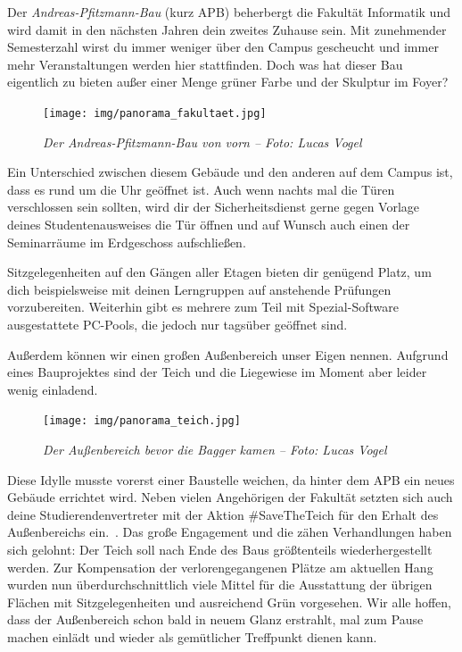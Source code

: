 
Der \emph{Andreas-Pfitzmann-Bau} (kurz APB) beherbergt die Fakultät Informatik und wird damit in den nächsten Jahren dein zweites Zuhause sein.
Mit zunehmender Semesterzahl wirst du immer weniger über den Campus gescheucht und immer mehr Veranstaltungen werden hier stattfinden.
Doch was hat dieser Bau eigentlich zu bieten außer einer Menge grüner Farbe und der Skulptur im Foyer?

\begin{figure}[h!]
    \centering
    \texttt{[image: img/panorama\_fakultaet.jpg]}
    \caption*{\small \textit{Der Andreas-Pfitzmann-Bau von vorn -- Foto: Lucas Vogel}}
\end{figure}

Ein Unterschied zwischen diesem Gebäude und den anderen auf dem Campus ist, dass es rund um die Uhr geöffnet ist. Auch wenn nachts mal die Türen verschlossen sein sollten, wird dir der Sicherheitsdienst gerne gegen Vorlage deines Studentenausweises die Tür öffnen und auf Wunsch auch einen der Seminarräume im Erdgeschoss aufschließen.

Sitzgelegenheiten auf den Gängen aller Etagen bieten dir genügend Platz, um dich beispielsweise mit deinen Lerngruppen auf anstehende Prüfungen vorzubereiten. Weiterhin gibt es mehrere zum Teil mit Spezial-Software ausgestattete PC-Pools, die jedoch nur tagsüber geöffnet sind.

\label{sec:apb}
Außerdem können wir einen großen Außenbereich unser Eigen nennen. Aufgrund eines Bauprojektes sind der Teich und die Liegewiese im Moment aber leider wenig einladend. 

\begin{figure}[t]
    \centering
    \texttt{[image: img/panorama\_teich.jpg]}
    \caption*{\small \textit{Der Außenbereich bevor die Bagger kamen -- Foto: Lucas Vogel}}
\end{figure}

Diese Idylle musste vorerst einer Baustelle weichen, da hinter dem APB ein neues Gebäude errichtet wird. Neben vielen Angehörigen der Fakultät setzten sich auch deine Studierendenvertreter mit der Aktion \#SaveTheTeich für den Erhalt des Außenbereichs ein.~.
Das große Engagement und die zähen Verhandlungen haben sich gelohnt: Der Teich soll nach Ende des Baus größtenteils wiederhergestellt werden. Zur Kompensation der verlorengegangenen Plätze am aktuellen Hang wurden nun überdurchschnittlich viele Mittel für die Ausstattung der übrigen Flächen mit Sitzgelegenheiten und ausreichend Grün vorgesehen. Wir alle hoffen, dass der Außenbereich schon bald in neuem Glanz erstrahlt, mal zum Pause machen einlädt und wieder als gemütlicher Treffpunkt dienen kann.

